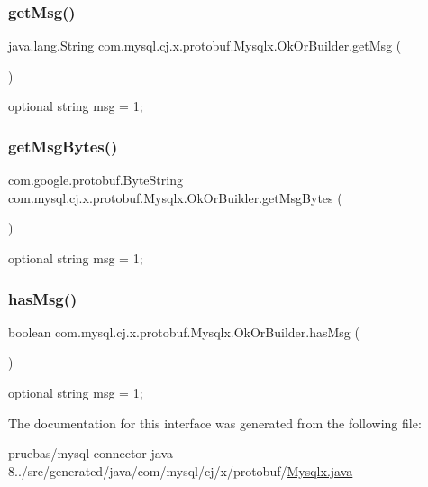\subsubsection{\texorpdfstring{get\+Msg()}{getMsg()}}
{\footnotesize\ttfamily java.\+lang.\+String com.\+mysql.\+cj.\+x.\+protobuf.\+Mysqlx.\+Ok\+Or\+Builder.\+get\+Msg (\begin{DoxyParamCaption}{ }\end{DoxyParamCaption})}

{\ttfamily optional string msg = 1;} \mbox{\label{interfacecom_1_1mysql_1_1cj_1_1x_1_1protobuf_1_1_mysqlx_1_1_ok_or_builder_af92cf058531f0821e02b879fcebb390d}} 
\subsubsection{\texorpdfstring{get\+Msg\+Bytes()}{getMsgBytes()}}
{\footnotesize\ttfamily com.\+google.\+protobuf.\+Byte\+String com.\+mysql.\+cj.\+x.\+protobuf.\+Mysqlx.\+Ok\+Or\+Builder.\+get\+Msg\+Bytes (\begin{DoxyParamCaption}{ }\end{DoxyParamCaption})}

{\ttfamily optional string msg = 1;} \mbox{\label{interfacecom_1_1mysql_1_1cj_1_1x_1_1protobuf_1_1_mysqlx_1_1_ok_or_builder_a9b1ae02c52fbfc44576de1addcfe0bf4}} 
\subsubsection{\texorpdfstring{has\+Msg()}{hasMsg()}}
{\footnotesize\ttfamily boolean com.\+mysql.\+cj.\+x.\+protobuf.\+Mysqlx.\+Ok\+Or\+Builder.\+has\+Msg (\begin{DoxyParamCaption}{ }\end{DoxyParamCaption})}

{\ttfamily optional string msg = 1;} 

The documentation for this interface was generated from the following file\+:\begin{DoxyCompactItemize}
\item 
pruebas/mysql-\/connector-\/java-\/8../src/generated/java/com/mysql/cj/x/protobuf/\mbox{\hyperlink{_mysqlx_8java}{Mysqlx.\+java}}\end{DoxyCompactItemize}
